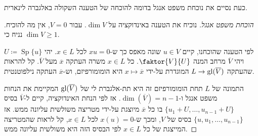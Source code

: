 \documentclass{report}
\theoremstyle{break}
\theoremstyle{MyNonumberbreak}
\newtheorem{proof}{הוכחה}
\DeclareMathOperator{\Sp}{Sp}
\begin{document}
כעת נסיים את נוכחת משפט אנגל בדומה להוכחה של הטענה השקולה באלגברה לינארית.
\begin{proof}[הוכחת משפט אנגל]
	נוכיח את הטענה באינדוקציה על $\dim V$. עבור $V = 0$, אין מה להוכיח. נניח כי $\dim V \ge 1$.
	
	לפי הטענה שהוכחנו, קיים $u \in V$ שונה מאפס כך ש-$xu = 0$ לכל $x \in L$. יהי $U \coloneqq \Sp\{u\}$ ויהי $\overline{V}$ מרחב המנה $\faktor{V}{U}$. כל $x \in L$ משרה העתקה $\overline{x}$ מעל $\overline{V}$. קל להראות שהעתקה $L \to \operatorname{gl}(\overline{V})$ המוגדרת על-ידי $x \mapsto \overline{x}$ היא הומומורפיזם, וש-$\overline{x}$ העתקה נילפוטנטית.
	
	התמונה של $L$ תחת הומומורפיזם זה היא תת-אלגברת לי של $\operatorname{gl}(\overline{V})$ המקיימת את הנחות משפט אנגל ו-$\dim(\overline{V}) = n-1$. אז לפי הנחת האינדוקציה, קיים ל-$\overline{V}$ בסיס $\{u_1 + U, \ldots, u_{n-1} + U\}$ בו כל $\overline{x}$ מיוצגת על-ידי מטריצה משולשית עליונה ממש. אז $\{u, u_1, \ldots, u_{n-1}\}$ בסיס של $V$, ומכך ש-$x(u) = 0$ לכל $x \in L$, קל לראות שהמטריצה המייצגת של כל $x \in L$ לפי הבסיס הזה היא משולשית עליונה ממש.
\end{proof}
\end{document}
